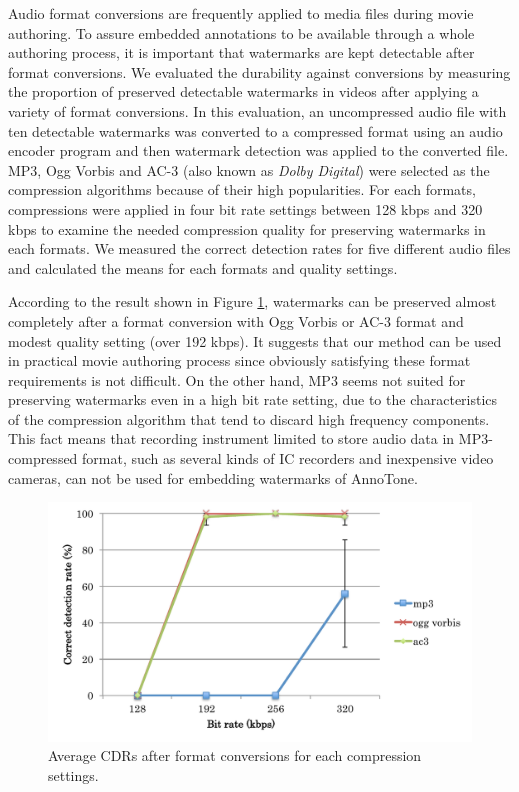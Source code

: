 Audio format conversions are frequently applied to media files during movie authoring.
To assure embedded annotations to be available through a whole authoring process, it is important that watermarks are kept detectable after format conversions.
We evaluated the durability against conversions by measuring the proportion of preserved detectable watermarks in videos after applying a variety of format conversions.
In this evaluation, an uncompressed audio file with ten detectable watermarks was converted to a compressed format using an audio encoder program and then watermark detection was applied to the converted file.
MP3, Ogg Vorbis and AC-3 (also known as {\it Dolby Digital}) were selected as the compression algorithms because of their high popularities.
For each formats, compressions were applied in four bit rate settings between 128 kbps and 320 kbps to examine the needed compression quality for preserving watermarks in each formats.
We measured the correct detection rates for five different audio files and calculated the means for each formats and quality settings.

According to the result shown in Figure \ref{fig:eval_conv}, watermarks can be preserved almost completely after a format conversion with Ogg Vorbis or AC-3 format and modest quality setting (over 192 kbps).
It suggests that our method can be used in practical movie authoring process since obviously satisfying these format requirements is not difficult.
On the other hand, MP3 seems not suited for preserving watermarks even in a high bit rate setting, due to the characteristics of the compression algorithm that tend to discard high frequency components.
This fact means that recording instrument limited to store audio data in MP3-compressed format, such as several kinds of IC recorders and inexpensive video cameras, can not be used for embedding watermarks of AnnoTone.

\begin{figure}[htbp]
 \begin{center}
  \includegraphics[width=120mm]{evaluation_conversion.pdf}
 \end{center}
 \caption{Average CDRs after format conversions for each compression settings.}
 \label{fig:eval_conv}
\end{figure}